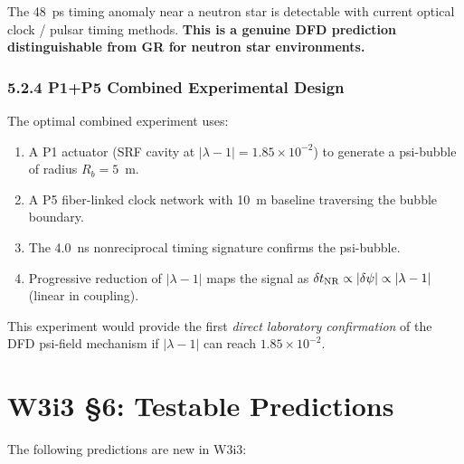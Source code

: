 \documentclass[11pt,twocolumn]{article}
\newcommand{\dpsi}{\delta\psi}
\newcommand{\lam}{\lambda}
\begin{document}
The 48~ps timing anomaly near a neutron star is detectable with current
optical clock / pulsar timing methods. \textbf{This is a genuine DFD
prediction distinguishable from GR for neutron star environments.}

\subsubsection*{5.2.4 P1+P5 Combined Experimental Design}

The optimal combined experiment uses:
\begin{enumerate}[nosep]
\item A P1 actuator (SRF cavity at $|\lam-1| = 1.85\times10^{-2}$) to
  generate a psi-bubble of radius $R_b = 5$~m.
\item A P5 fiber-linked clock network with 10~m baseline traversing the
  bubble boundary.
\item The 4.0~ns nonreciprocal timing signature confirms the psi-bubble.
\item Progressive reduction of $|\lam-1|$ maps the signal as $\delta t_{\rm NR}
  \propto |\dpsi| \propto |\lam-1|$ (linear in coupling).
\end{enumerate}

This experiment would provide the first \emph{direct laboratory confirmation}
of the DFD psi-field mechanism if $|\lam-1|$ can reach $1.85\times10^{-2}$.

\section*{W3i3 \S6: Testable Predictions}
\label{sec:predictions}

\noindent The following predictions are new in W3i3:
\end{document}
